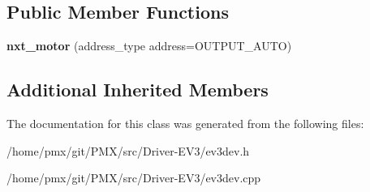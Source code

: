 \subsection*{Public Member Functions}
\begin{DoxyCompactItemize}
\item 
\mbox{\label{classev3dev_1_1nxt__motor_a4fe5b5660be5c91bdec049d239e62fdc}} 
{\bfseries nxt\+\_\+motor} (address\+\_\+type address=O\+U\+T\+P\+U\+T\+\_\+\+A\+U\+TO)
\end{DoxyCompactItemize}
\subsection*{Additional Inherited Members}


The documentation for this class was generated from the following files\+:\begin{DoxyCompactItemize}
\item 
/home/pmx/git/\+P\+M\+X/src/\+Driver-\/\+E\+V3/ev3dev.\+h\item 
/home/pmx/git/\+P\+M\+X/src/\+Driver-\/\+E\+V3/ev3dev.\+cpp\end{DoxyCompactItemize}
